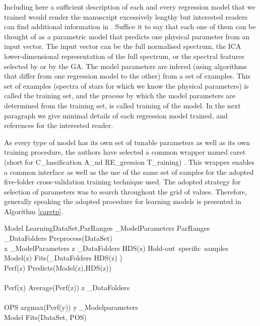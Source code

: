 Including here a sufficient description of each and every regression
model that we trained would render the manuscript excessively
lengthy but interested readers can find additional information in 
\cite{baraud2002model,geman1992neural,elith2008working,meyer2003support,svetnik2003random}.
Suffice it to say that each one of them can be thought of as
a parametric model that predicts one physical parameter from an input
vector. The input vector can be the full normalised spectrum, the ICA
lower-dimensional representation of the full spectrum, or the spectral
features selected by \cite{cesetti} or by the GA. The model parameters
are infered (using algorithms that differ from one regression model to
the other) from a set of examples. This set of examples (spectra of
stars for which we know the physical parameters) is called the
training set, and the process by which the model parameters are
determined from the training set, is called training of the model. In
the next paragraph we give minimal details of each regression model
trained, and references for the interested reader.

As every type of model has its own set of tunable parameters as well as
its own training procedure, the authors have selected a common wrapper 
named caret  (short for C\_lassification A\_nd RE\_gression T\_raining) \cite{caret}.
This wrapper enables a common interface as well as the use of the same 
set of samples for the adopted five-folder cross-validation training
technique used. The adopted strategy for selection of parameters was 
to search throughout the grid of values.
Therefore, generally speaking the adopted procedure for learning models 
is presented in Algorithm \ref{caretp}.

\begin{pseudocode}[shadowbox]{Model Learning}{DataSet,ParRanges}
\label{caretp}
 _{ModelParameters} \GETS ParRanges \\
 _{DataFolders} \GETS Preprocess(DataSet) \\ 
 \FOREACH x \in {}_{ModelParameters} \DO
  \BEGIN
    \FOREACH z \in {}_{DataFolders} \DO
      \BEGIN
	HDS(z) \GETS \mbox{Hold-out specific samples} \\
	Model(z) \GETS Fits(_{DataFolders} \setminus HDS(z) ) \\
	Perf(z) \GETS Predicts(Model(z),HDS(z)) \\
      \END \\
    Perf(x) \GETS Average(Perf(z)) \quad \forall z \in {}_{DataFolders} \\
  \END \\
  
  OPS \GETS argmax(Perf(y)) \quad \forall y \in {}_{Modelparameters} \\
  Model \GETS Fits(DataSet, POS) \\
\end{pseudocode}


